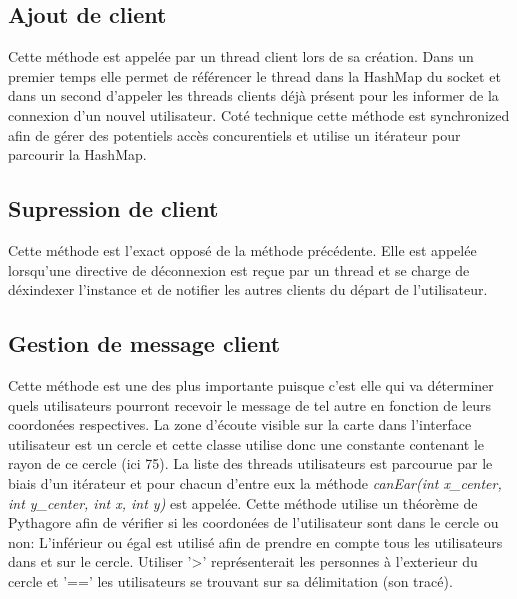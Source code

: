 \documentclass[a4paper,12pt]{report}
\begin{document}
      \subsection{Ajout de client}
        \medbreak
        Cette méthode est appelée par un thread client lors de sa création. Dans un premier temps elle permet de référencer le thread dans la HashMap du socket et dans un second d'appeler les threads clients déjà présent pour les informer de la connexion d'un nouvel utilisateur.
        \medbreak
        Coté technique cette méthode est synchronized afin de gérer des potentiels accès concurentiels et utilise un itérateur pour parcourir la HashMap.

      \subsection{Supression de client}
        \medbreak
        Cette méthode est l'exact opposé de la méthode précédente. Elle est appelée lorsqu'une directive de déconnexion est reçue par un thread et se charge de déxindexer l'instance et de notifier les autres clients du départ de l'utilisateur.

      \subsection{Gestion de message client}
        \medbreak
        Cette méthode est une des plus importante puisque c'est elle qui va déterminer quels utilisateurs pourront recevoir le message de tel autre en fonction de leurs coordonées respectives.
        \medbreak
        La zone d'écoute visible sur la carte dans l'interface utilisateur est un cercle et cette classe utilise donc une constante contenant le rayon de ce cercle (ici 75). La liste des threads utilisateurs est parcourue par le biais d'un itérateur et pour chacun d'entre eux la méthode \emph{canEar(int x\_center, int y\_center, int x, int y)} est appelée.
        \medbreak
        Cette méthode utilise un théorème de Pythagore afin de vérifier si les coordonées de l'utilisateur sont dans le cercle ou non:
        \medbreak
        \medbreak
        L'inférieur ou égal est utilisé afin de prendre en compte tous les utilisateurs dans et sur le cercle. Utiliser '>' représenterait les personnes à l'exterieur du cercle et '==' les utilisateurs se trouvant sur sa délimitation (son tracé).
\end{document}
